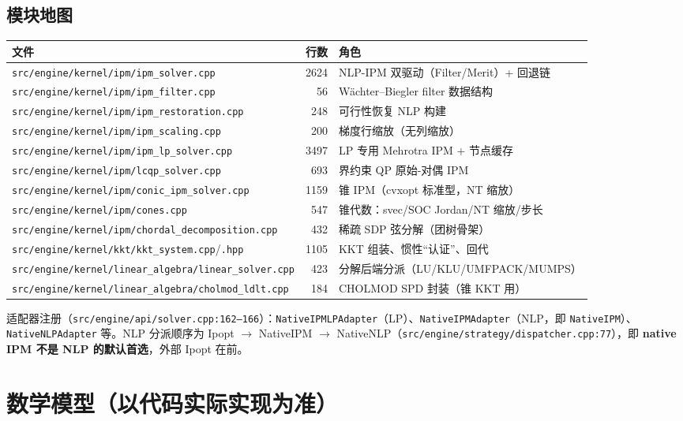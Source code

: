 \documentclass[11pt,a4paper]{ctexart}
\newcommand{\file}[1]{\texttt{#1}}
\newcommand{\func}[1]{\texttt{#1}}
\begin{document}
\subsection{模块地图}
\begin{center}\footnotesize
\begin{tabular}{@{}lrl@{}}
\toprule
文件 & 行数 & 角色 \\
\midrule
\file{src/engine/kernel/ipm/ipm\_solver.cpp} & 2624 & NLP-IPM 双驱动（Filter/Merit）+ 回退链 \\
\file{src/engine/kernel/ipm/ipm\_filter.cpp} & 56 & Wächter--Biegler filter 数据结构 \\
\file{src/engine/kernel/ipm/ipm\_restoration.cpp} & 248 & 可行性恢复 NLP 构建 \\
\file{src/engine/kernel/ipm/ipm\_scaling.cpp} & 200 & 梯度行缩放（无列缩放） \\
\file{src/engine/kernel/ipm/ipm\_lp\_solver.cpp} & 3497 & LP 专用 Mehrotra IPM + 节点缓存 \\
\file{src/engine/kernel/ipm/lcqp\_solver.cpp} & 693 & 界约束 QP 原始-对偶 IPM \\
\file{src/engine/kernel/ipm/conic\_ipm\_solver.cpp} & 1159 & 锥 IPM（cvxopt 标准型，NT 缩放） \\
\file{src/engine/kernel/ipm/cones.cpp} & 547 & 锥代数：svec/SOC Jordan/NT 缩放/步长 \\
\file{src/engine/kernel/ipm/chordal\_decomposition.cpp} & 432 & 稀疏 SDP 弦分解（团树骨架） \\
\file{src/engine/kernel/kkt/kkt\_system.cpp}/\file{.hpp} & 1105 & KKT 组装、惯性``认证''、回代 \\
\file{src/engine/kernel/linear\_algebra/linear\_solver.cpp} & 423 & 分解后端分派（LU/KLU/UMFPACK/MUMPS） \\
\file{src/engine/kernel/linear\_algebra/cholmod\_ldlt.cpp} & 184 & CHOLMOD SPD 封装（锥 KKT 用） \\
\bottomrule
\end{tabular}
\end{center}

适配器注册（\file{src/engine/api/solver.cpp:162--166}）：\func{NativeIPMLPAdapter}（LP）、\func{NativeIPMAdapter}（NLP，即 \func{NativeIPM}）、\func{NativeNLPAdapter} 等。NLP 分派顺序为 Ipopt $\to$ NativeIPM $\to$ NativeNLP（\file{src/engine/strategy/dispatcher.cpp:77}），即 \textbf{native IPM 不是 NLP 的默认首选}，外部 Ipopt 在前。

\section{数学模型（以代码实际实现为准）}
\end{document}
